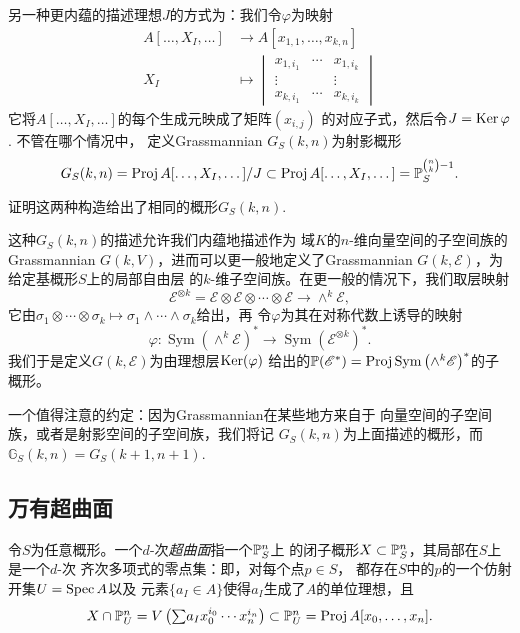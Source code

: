 
另一种更内蕴的描述理想$J$的方式为：我们令$\varphi$为映射
\begin{align*}
A[\dots,X_I,\dots]&\longrightarrow 
A[x_{1,1},\dots,x_{k,n}]\\
X_I &\longmapsto 
\begin{vmatrix}
x_{1,i_1}&\cdots & x_{1,i_k}\\
\vdots &&\vdots\\
x_{k,i_1}&\cdots & x_{k,i_k}
\end{vmatrix}
\end{align*}
它将$A[\dots,X_I,\dots]$的每个生成元映成了矩阵$(x_{i,j})$
的对应子式，然后令$J=\Ker \varphi$. 不管在哪个情况中，
定义Grassmannian $G_S(k,n)$为射影概形
\[
	G_S(k,n)=\proj A[\dots,X_I,\dots]/J
	\subset \proj A[\dots,X_I,\dots]=\P_S^{\binom nk -1}.
\]

\begin{exe}\label{exe:3.49}
证明这两种构造给出了相同的概形$G_S(k,n)$.
\end{exe}

这种$G_S(k,n)$的描述允许我们内蕴地描述作为
域$K$的$n$-维向量空间的子空间族的Grassmannian
$G(k,V)$，进而可以更一般地定义了Grassmannian
$G(k,\mathscr E)$，为给定基概形$S$上的局部自由层
的$k$-维子空间族。在更一般的情况下，我们取层映射
\[
	\mathscr E^{\otimes k}=
	\mathscr E\otimes\mathscr E\otimes\cdots\otimes
	\mathscr E\longrightarrow \wedge^k\mathscr E,
\]
它由$\sigma_1\otimes \cdots\otimes \sigma_k\mapsto
\sigma_1\wedge \cdots\wedge \sigma_k$给出，再
令$\varphi$为其在对称代数上诱导的映射
\[
	\varphi:\operatorname{Sym}\left(\wedge^k 
	\mathscr E\right)^* \longrightarrow \operatorname{Sym}
	\left(\mathscr E^{\otimes k}\right)^*.
\]
我们于是定义$G(k,\mathscr E)$为由理想层$\Ker(\varphi)$
给出的$\P(\mathscr E^*)=\proj \operatorname{Sym}
\left(\wedge^k \mathscr E\right)^*$的子概形。

一个值得注意的约定：因为Grassmannian在某些地方来自于
向量空间的子空间族，或者是射影空间的子空间族，我们将记
$G_S(k,n)$为上面描述的概形，而$\mathbb G_S(k,n)=
G_S(k+1,n+1)$.

\subsection{万有超曲面} \label{s:3.2.8}

\begin{defi}\label{defi:3.50}
令$S$为任意概形。一个$d$-次\textit{超曲面}指一个$\P_S^n$上
的闭子概形$X\subset \P_S^n$，其局部在$S$上是一个$d$-次
齐次多项式的零点集：即，对每个点$p\in S$，
都存在$S$中的$p$的一个仿射开集$U=\spec A$以及
元素$\{a_I\in A\}$使得$a_I$生成了$A$的单位理想，且
\[
	\textstyle{X\cap \P_U^n=V\left(
		{\sum}a_I x_0^{i_0}\cdots x_n^{i_n}
	\right)\subset \P_U^n=\proj A[x_0,\dots,x_n].}
\]
\end{defi}

